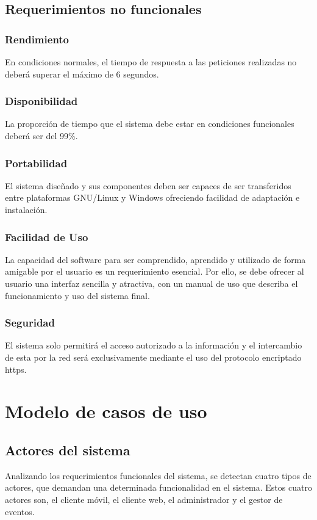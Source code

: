 \subsection{Requerimientos no funcionales}


\subsubsection*{Rendimiento}
En condiciones normales, el tiempo de respuesta a las peticiones realizadas no deberá superar el máximo de 6 segundos.

\subsubsection*{Disponibilidad}
La proporción de tiempo que el sistema debe estar en condiciones funcionales deberá ser del 99\%.


\subsubsection*{Portabilidad}
El sistema diseñado y sus componentes deben ser capaces de ser transferidos entre plataformas GNU/Linux y Windows ofreciendo facilidad de adaptación e instalación.

\subsubsection*{Facilidad de Uso}
La capacidad del software para ser comprendido, aprendido y utilizado de forma amigable por el usuario es un requerimiento esencial. Por ello, se debe ofrecer al usuario una interfaz sencilla y atractiva, con un manual de uso que describa el funcionamiento y uso del sistema final.

\subsubsection*{Seguridad}
El sistema solo permitirá el acceso autorizado a la información y el intercambio de esta por la red será exclusivamente mediante el uso del protocolo encriptado https.

\section{Modelo de casos de uso}

\subsection{Actores del sistema}
Analizando los requerimientos funcionales del sistema, se detectan cuatro tipos de actores, que demandan una determinada funcionalidad en el sistema. Estos cuatro actores son, el cliente móvil, el cliente web, el administrador y el gestor de eventos.


